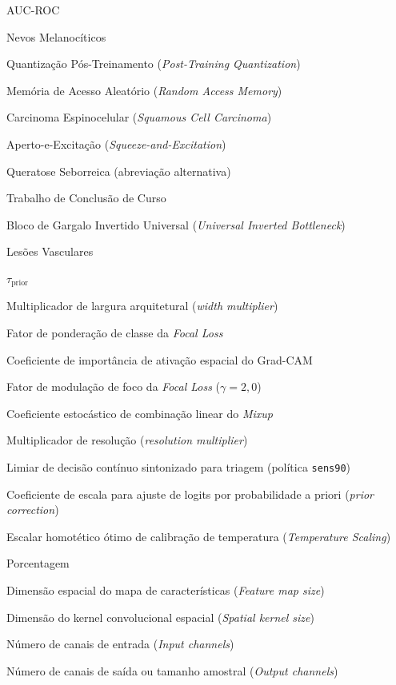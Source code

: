 \documentclass[oneside,english,brazilian]{UNISINOSmonografia}
\begin{document}
\begin{listadesiglas}{AUC-ROC}
\item[NV] Nevos Melanocíticos
\item[PTQ] Quantização Pós-Treinamento (\textit{Post-Training Quantization})
\item[RAM] Memória de Acesso Aleatório (\textit{Random Access Memory})
\item[SCC] Carcinoma Espinocelular (\textit{Squamous Cell Carcinoma})
\item[SE] Aperto-e-Excitação (\textit{Squeeze-and-Excitation})
\item[SEK] Queratose Seborreica (abreviação alternativa)
\item[TCC] Trabalho de Conclusão de Curso
\item[UIB] Bloco de Gargalo Invertido Universal (\textit{Universal Inverted Bottleneck})
\item[VASC] Lesões Vasculares
\end{listadesiglas}

%
\begin{listadesimbolos}{$\tau_{\text{prior}}$}
\item[$\alpha$] Multiplicador de largura arquitetural (\textit{width multiplier})
\item[$\alpha_t$] Fator de ponderação de classe da \textit{Focal Loss}
\item[$\alpha_k^c$] Coeficiente de importância de ativação espacial do Grad-CAM
\item[$\gamma$] Fator de modulação de foco da \textit{Focal Loss} ($\gamma = 2{,}0$)
\item[$\lambda$] Coeficiente estocástico de combinação linear do \textit{Mixup}
\item[$\rho$] Multiplicador de resolução (\textit{resolution multiplier})
\item[$\tau^*$] Limiar de decisão contínuo sintonizado para triagem (política \texttt{sens90})
\item[$\tau_{\text{prior}}$] Coeficiente de escala para ajuste de logits por probabilidade a priori (\textit{prior correction})
\item[$T^*$] Escalar homotético ótimo de calibração de temperatura (\textit{Temperature Scaling})
\item[\%] Porcentagem
\item[$D_F$] Dimensão espacial do mapa de características (\textit{Feature map size})
\item[$D_K$] Dimensão do kernel convolucional espacial (\textit{Spatial kernel size})
\item[$M$] Número de canais de entrada (\textit{Input channels})
\item[$N$] Número de canais de saída ou tamanho amostral (\textit{Output channels})
\end{listadesimbolos}
\end{document}
